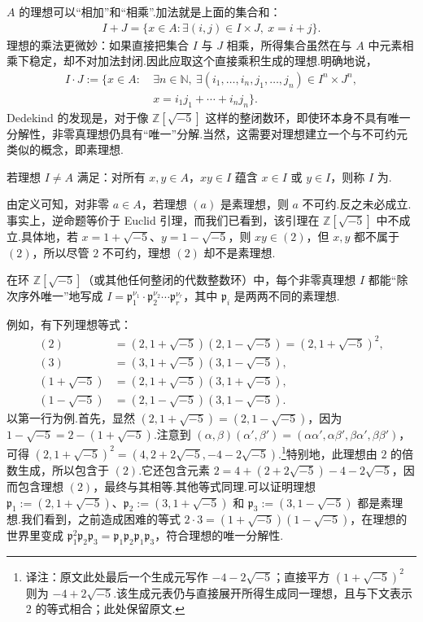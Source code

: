$A$ 的理想可以``相加''和``相乘''.加法就是上面的集合和：
\begin{align*}
I+J=\{x\in A:\exists(i,j)\in I\times J,\ x=i+j\}.
\end{align*}
理想的乘法更微妙：如果直接把集合 $I$ 与 $J$ 相乘，所得集合虽然在与 $A$ 中元素相乘下稳定，却不对加法封闭.因此应取这个直接乘积生成的理想.明确地说，
\begin{align*}
I\cdot J:=\{x\in A:\ &\exists n\in\mathbb N,\ \exists(i_1,\ldots,i_n,j_1,\ldots,j_n)\in I^n\times J^n,\\
&x=i_1j_1+\cdots+i_nj_n\}.
\end{align*}
Dedekind 的发现是，对于像 $\mathbb Z[\sqrt{-5}]$ 这样的整闭数环，即使环本身不具有唯一分解性，非零真理想仍具有``唯一''分解.当然，这需要对理想建立一个与不可约元类似的概念，即素理想.
\begin{definition*}
若理想 $I\ne A$ 满足：对所有 $x,y\in A$，$xy\in I$ 蕴含 $x\in I$ 或 $y\in I$，则称 $I$ 为.
\end{definition*}
由定义可知，对非零 $a\in A$，若理想 $(a)$ 是素理想，则 $a$ 不可约.反之未必成立.事实上，逆命题等价于 Euclid 引理，而我们已看到，该引理在 $\mathbb Z[\sqrt{-5}]$ 中不成立.具体地，若 $x=1+\sqrt{-5}$、$y=1-\sqrt{-5}$，则 $xy\in(2)$，但 $x,y$ 都不属于 $(2)$，所以尽管 $2$ 不可约，理想 $(2)$ 却不是素理想.
\begin{theorem*}[{Dedekind}]
在环 $\mathbb Z[\sqrt{-5}]$（或其他任何整闭的代数整数环）中，每个非零真理想 $I$ 都能``除次序外唯一''地写成 $I=\mathfrak p_1^{\nu_1}\cdot\mathfrak p_2^{\nu_2}\cdots\mathfrak p_r^{\nu_r}$，其中 $\mathfrak p_i$ 是两两不同的素理想.
\end{theorem*}
例如，有下列理想等式：
\begin{align*}
(2)&=(2,1+\sqrt{-5})(2,1-\sqrt{-5})=(2,1+\sqrt{-5})^2,\\
(3)&=(3,1+\sqrt{-5})(3,1-\sqrt{-5}),\\
(1+\sqrt{-5})&=(2,1+\sqrt{-5})(3,1+\sqrt{-5}),\\
(1-\sqrt{-5})&=(2,1-\sqrt{-5})(3,1-\sqrt{-5}).
\end{align*}
以第一行为例.首先，显然 $(2,1+\sqrt{-5})=(2,1-\sqrt{-5})$，因为 $1-\sqrt{-5}=2-(1+\sqrt{-5})$.注意到 $(\alpha,\beta)(\alpha',\beta')=(\alpha\alpha',\alpha\beta',\beta\alpha',\beta\beta')$，可得 $(2,1+\sqrt{-5})^2=(4,2+2\sqrt{-5},-4-2\sqrt{-5})$.\footnote{译注：原文此处最后一个生成元写作 $-4-2\sqrt{-5}$；直接平方 $(1+\sqrt{-5})^2$ 则为 $-4+2\sqrt{-5}$.该生成元表仍与直接展开所得生成同一理想，且与下文表示 $2$ 的等式相合；此处保留原文.}特别地，此理想由 $2$ 的倍数生成，所以包含于 $(2)$.它还包含元素 $2=4+(2+2\sqrt{-5})-4-2\sqrt{-5}$，因而包含理想 $(2)$，最终与其相等.其他等式同理.可以证明理想 $\mathfrak p_1:=(2,1+\sqrt{-5})$、$\mathfrak p_2:=(3,1+\sqrt{-5})$ 和 $\mathfrak p_3:=(3,1-\sqrt{-5})$ 都是素理想.我们看到，之前造成困难的等式 $2\cdot3=(1+\sqrt{-5})(1-\sqrt{-5})$，在理想的世界里变成 $\mathfrak p_1^2\mathfrak p_2\mathfrak p_3=\mathfrak p_1\mathfrak p_2\mathfrak p_1\mathfrak p_3$，符合理想的唯一分解性.
